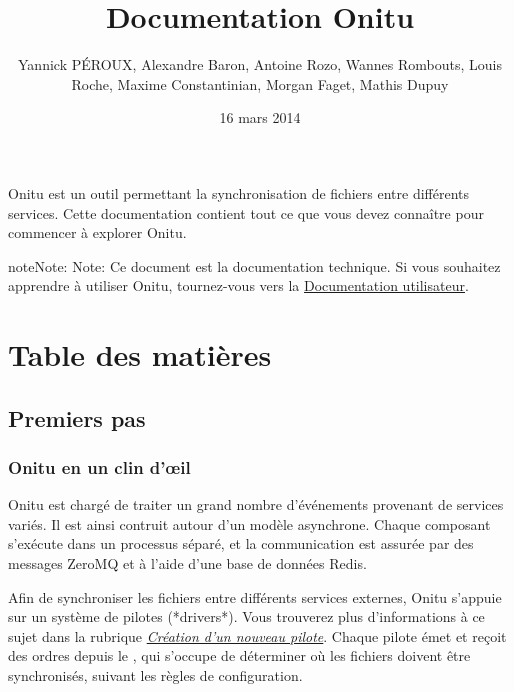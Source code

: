 \documentclass[letterpaper,10pt,english]{sphinxmanual}
\title{Documentation Onitu}
\date{16 mars 2014}
\author{Yannick PÉROUX, Alexandre Baron, Antoine Rozo, Wannes Rombouts, Louis Roche, Maxime Constantinian, Morgan Faget, Mathis Dupuy}
\begin{document}
\maketitle
\tableofcontents
{}\label{index::doc}


Onitu est un outil permettant la synchronisation de fichiers entre différents services. Cette documentation contient tout ce que vous devez connaître pour commencer à explorer Onitu.

\begin{notice}{note}{Note:}
Note: Ce document est la documentation technique. Si vous souhaitez apprendre à utiliser Onitu, tournez-vous vers la \href{http://github.com/onitu/onitu}{Documentation utilisateur}.
\end{notice}


\chapter{Table des matières}
\label{index:onitu-version-technical-documentation}\label{index:content-table}\label{index:user-documentation}

\section{Premiers pas}
\label{intro:getting-started}\label{intro::doc}

\subsection{Onitu en un clin d'œil}
\label{intro:onitu-at-a-glance}
Onitu est chargé de traiter un grand nombre d'événements provenant de services variés. Il est ainsi contruit autour d'un modèle asynchrone. Chaque composant s'exécute dans un processus séparé, et la communication est assurée par des messages ZeroMQ et à l'aide d'une base de données Redis.

Afin de synchroniser les fichiers entre différents services externes, Onitu s'appuie sur un système de pilotes (*drivers*). Vous trouverez plus d'informations à ce sujet dans la rubrique {\hyperref[drivers::doc]{\emph{Création d'un nouveau pilote}}}. Chaque pilote émet et reçoit des ordres depuis le {\hyperref[components:onitu.referee.Referee]{}}, qui s'occupe de déterminer où les fichiers doivent être synchronisés, suivant les règles de configuration.
\end{document}
